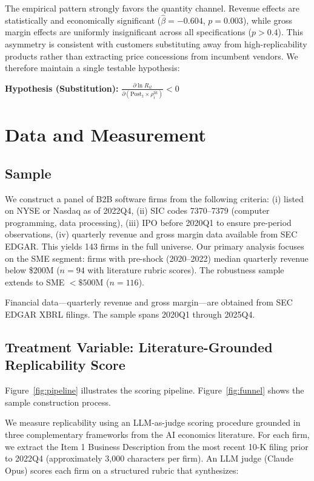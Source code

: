 \documentclass[12pt,a4paper]{article}
\begin{document}
The empirical pattern strongly favors the quantity channel. Revenue effects are statistically and economically significant ($\hat{\beta} = -0.604$, $p = 0.003$), while gross margin effects are uniformly insignificant across all specifications ($p > 0.4$). This asymmetry is consistent with customers substituting away from high-replicability products rather than extracting price concessions from incumbent vendors. We therefore maintain a single testable hypothesis:

\textbf{Hypothesis (Substitution):} $\frac{\partial \ln R_{it}}{\partial (\text{Post}_t \times \rho_i^{\text{lit}})} < 0$

\section{Data and Measurement}
\label{sec:data}

\subsection{Sample}

We construct a panel of B2B software firms from the following criteria: (i) listed on NYSE or Nasdaq as of 2022Q4, (ii) SIC codes 7370--7379 (computer programming, data processing), (iii) IPO before 2020Q1 to ensure pre-period observations, (iv) quarterly revenue and gross margin data available from SEC EDGAR. This yields 143 firms in the full universe. Our primary analysis focuses on the SME segment: firms with pre-shock (2020--2022) median quarterly revenue below \$200M ($n=94$ with literature rubric scores). The robustness sample extends to SME $<\$500$M ($n=116$).

Financial data---quarterly revenue and gross margin---are obtained from SEC EDGAR XBRL filings. The sample spans 2020Q1 through 2025Q4.

\subsection{Treatment Variable: Literature-Grounded Replicability Score}

Figure~\ref{fig:pipeline} illustrates the scoring pipeline. Figure~\ref{fig:funnel} shows the sample construction process.

We measure replicability using an LLM-as-judge scoring procedure grounded in three complementary frameworks from the AI economics literature. For each firm, we extract the Item 1 Business Description from the most recent 10-K filing prior to 2022Q4 (approximately 3,000 characters per firm). An LLM judge (Claude Opus) scores each firm on a structured rubric that synthesizes:
\end{document}
